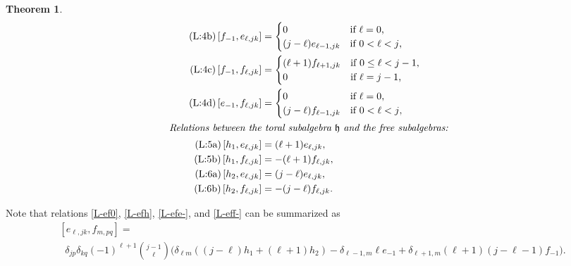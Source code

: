 \documentclass[11pt,letterpaper]{amsart}
\newcounter{thecounter}
\numberwithin{thecounter}{section}
\newtheorem{theorem}[thecounter]{Theorem}
\theoremstyle{definition}
\DeclareMathOperator{\ad}{ad}
\begin{document}
\begin{theorem}
\begin{align*}
\tag{L:4b}\label{L-f-e}
  \left[f_{-1}, e_{\ell,jk} \right]&=\begin{cases}0 &\text{if $\ell=0$,}\\ (j-\ell) e_{\ell-1,jk}&\text{if $0<\ell< j$,}\end{cases} \\
\tag{L:4c}\label{L-f-f}
  \left[f_{-1},  f_{\ell,jk} \right]&= \begin{cases} (\ell+1)f_{\ell+1,jk} &\text{if $0\le\ell<j-1$,}\\ 0&\text{if $\ell=j-1$,}\end{cases} \\ 
\tag{L:4d}\label{L-e-f}
  \left[e_{-1}, f_{\ell,jk} \right]&= \begin{cases}0 &\text{if $\ell=0$,}\\ (j-\ell)  f_{\ell-1,jk}&\text{if $0<\ell< j$,}\end{cases} \\
\intertext{{\it Relations between the toral subalgebra $\frak h$ and the free subalgebras:}}
\tag{L:5a}\label{L-h1e}
  \left[h_1, e_{\ell,jk} \right]&=(\ell+1) e_{\ell,jk},\\
\tag{L:5b}\label{L-h1f}
  \left[h_1,f_{\ell,jk} \right]&=-(\ell+1) f_{\ell,jk},\\
\tag{L:6a}\label{L-h2e}
  \left[h_2,  e_{\ell,jk} \right]&= (j-\ell) e_{\ell,jk},\\
\tag{L:6b}\label{L-h2f}
  \left[h_2,  f_{\ell,jk} \right]&= -(j-\ell) f_{\ell,jk}.
\end{align*}
\end{theorem}

\begin{longver}
Note that relations \eqref{L-ef0}, \eqref{L-efh}, \eqref{L-efe-}, and \eqref{L-eff-} can be summarized as
\begin{align*}
 & \left[ e_{\ell,jk}, f_{m,pq} \right]=\\ &\;\; \delta_{jp}\delta_{kq} (-1)^{\ell+1} \binom{j-1}{\ell}  \big(  \delta_{\ell m} \left((j-\ell) h_1 +(\ell+1)h_2 \right)
  -\delta_{\ell-1,m} \ell e_{-1} +\delta_{\ell+1,m} (\ell+1)(j-\ell-1) f_{-1}\big). 
\end{align*}
\end{longver}
\end{document}
